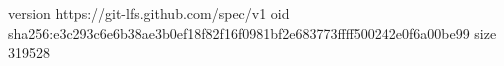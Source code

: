 version https://git-lfs.github.com/spec/v1
oid sha256:e3c293c6e6b38ae3b0ef18f82f16f0981bf2e683773ffff500242e0f6a00be99
size 319528
